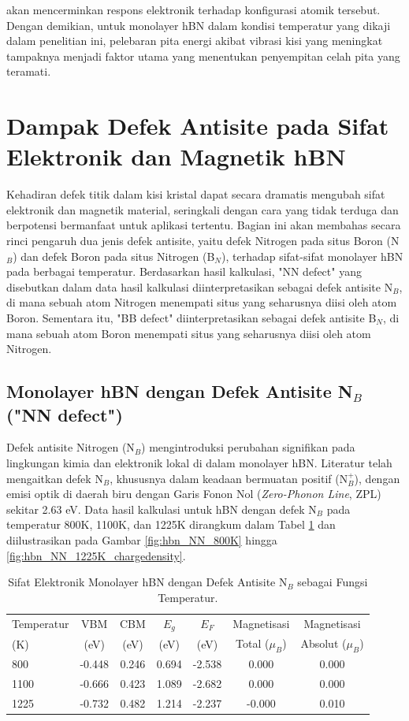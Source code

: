akan mencerminkan respons elektronik terhadap konfigurasi atomik tersebut. Dengan demikian, untuk monolayer hBN dalam kondisi temperatur yang dikaji dalam penelitian ini, pelebaran pita energi akibat vibrasi kisi yang meningkat tampaknya menjadi faktor utama yang menentukan penyempitan celah pita yang teramati. 
\section{Dampak Defek Antisite pada Sifat Elektronik dan Magnetik hBN}
\label{sec:hbn_defek}
Kehadiran defek titik dalam kisi kristal dapat secara dramatis mengubah sifat elektronik dan magnetik material, seringkali dengan cara yang tidak terduga dan berpotensi bermanfaat untuk aplikasi tertentu. Bagian ini akan membahas secara rinci pengaruh dua jenis defek antisite, yaitu defek Nitrogen pada situs Boron (N$_B$) dan defek Boron pada situs Nitrogen (B$_N$), terhadap sifat-sifat monolayer hBN pada berbagai temperatur. Berdasarkan hasil kalkulasi, "NN defect" yang disebutkan dalam data hasil kalkulasi  diinterpretasikan sebagai defek antisite N$_B$, di mana sebuah atom Nitrogen menempati situs yang seharusnya diisi oleh atom Boron. Sementara itu, "BB defect" diinterpretasikan sebagai defek antisite B$_N$, di mana sebuah atom Boron menempati situs yang seharusnya diisi oleh atom Nitrogen. 
\subsection{Monolayer hBN dengan Defek Antisite N$_B$ ("NN defect")}
\label{subsec:hbn_defek_nb}
Defek antisite Nitrogen (N$_B$) mengintroduksi perubahan signifikan pada lingkungan kimia dan elektronik lokal di dalam monolayer hBN. Literatur telah mengaitkan defek N$_B$, khususnya dalam keadaan bermuatan positif (N$_B^+$), dengan emisi optik di daerah biru dengan Garis Fonon Nol (\textit{Zero-Phonon Line}, ZPL) sekitar 2.63 eV. Data hasil kalkulasi untuk hBN dengan defek N$_B$ pada temperatur 800K, 1100K, dan 1225K dirangkum dalam Tabel \ref{tab:hbn_defek_nb} dan diilustrasikan pada Gambar \ref{fig:hbn_NN_800K} hingga \ref{fig:hbn_NN_1225K_chargedensity}. 
\begin{table}[h!]
  \centering
  \caption{Sifat Elektronik Monolayer hBN dengan Defek Antisite N$_B$ sebagai Fungsi Temperatur.}
  \label{tab:hbn_defek_nb}
  \begin{tabular}{lcccccc}
    \toprule
    Temperatur & VBM & CBM & $E_g$ & $E_F$ & Magnetisasi & Magnetisasi \\
    (K) & (eV) & (eV) & (eV) & (eV) & Total ($\mu_B$) & Absolut ($\mu_B$) \\
    \midrule
    800  & -0.448 &  0.246 & 0.694 & -2.538 & 0.000 & 0.000 \\
    1100 & -0.666 &  0.423 & 1.089 & -2.682 &  0.000 & 0.000 
 \\
    1225 & -0.732 &  0.482 & 1.214 & -2.237 & -0.000 & 0.010 \\
    \bottomrule
  \end{tabular}
\end{table}


